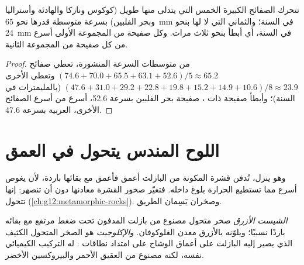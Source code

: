 \begin{proposition}\label{prop:g11:subduction-zones:fast}
تتحرك الصفائح الكبيرة الخمس التي يتدلى منها  طويل (كوكوس ونازكا والهادئة
وأستراليا وبحر الفلبين) بسرعة متوسطة قدرها نحو \qty{65}{mm} في السنة؛
والثماني التي لا  لها بنحو \qty{24}{mm} في السنة، أي أبطأ بنحو ثلاث مرات.
وكل صفيحة من المجموعة الأولى أسرع من كل صفيحة من المجموعة الثانية.
\end{proposition}

\begin{proof}
من متوسطات السرعة المنشورة، تعطي صفائح 
$(74.6 + 70.0 + 65.5 + 63.1 + 52.6)/5 \approx 65.2$ وتعطي الأخرى
$(47.6 + 31.0 + 29.2 + 22.8 + 19.8 + 15.2 + 14.9 + 10.6)/8 \approx 23.9$
(بالمليمترات في السنة)؛ وأبطأ صفيحة ذات ، صفيحة بحر الفلبين بسرعة
52.6، أسرع من أسرع الصفائح الأخرى، العربية بسرعة 47.6.
\end{proof}

\section{اللوح المندس يتحول في العمق}

وهو ينزل، تُدفن قشرة  المكونة من البازلت  أعمق
فأعمق مع بقائها باردة، لأن  يغوص أسرع مما تستطيع الحرارة بلوغ
داخله. فتغيّر صخور القشرة معادنها دون أن تنصهر: إنها
تتحول (\cref{ch:g12:metamorphic-rocks}). وصخران يَسِمان الطريق.

\begin{definition}\label{def:g11:subduction-zones:eclogite}
\emph{الشيست الأزرق} صخر متحول مصنوع من بازلت
 المدفون تحت ضغط مرتفع مع بقائه باردًا نسبيًا؛
ويلوّنه بالأزرق معدن الغلوكوفان. و\emph{الإكلوجيت}
هو الصخر المتحول الكثيف الذي يصير إليه البازلت  على أعماق الوشاح
على امتداد نطاقات : له التركيب الكيميائي نفسه، لكنه مصنوع من
العقيق الأحمر والبيروكسين الأخضر.
\end{definition}

